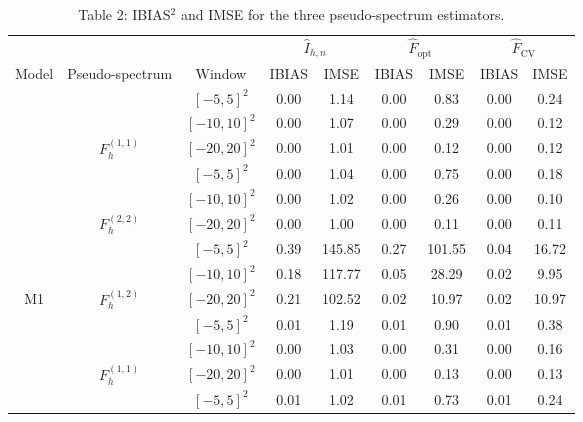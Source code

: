 \documentclass[12pt]{article}
\begin{document}
\begin{table}
	
	\caption*{Table 2: IBIAS$^2$ and IMSE for the three pseudo-spectrum estimators.}
	\centering
	\begin{tabular}[t]{ccccccccc}
		\toprule
		\multicolumn{3}{c}{ } & \multicolumn{2}{c}{$\hat{I}_{h,n}$} & \multicolumn{2}{c}{$\hat{F}_\text{opt}$} & \multicolumn{2}{c}{$\hat{F}_\text{CV}$} \\
		\cmidrule(l{3pt}r{3pt}){4-5} \cmidrule(l{3pt}r{3pt}){6-7} \cmidrule(l{3pt}r{3pt}){8-9}
		Model & Pseudo-spectrum & Window & IBIAS & IMSE & IBIAS & IMSE & IBIAS & IMSE\\
		\midrule
		&  & $[-5,5]^2$ & 0.00 & 1.14 & 0.00 & 0.83 & 0.00 & 0.24\\
		
		&  & $[-10,10]^2$ & 0.00 & 1.07 & 0.00 & 0.29 & 0.00 & 0.12\\
		
		& \multirow{-3}{*}{$F^{(1,1)}_h$} & $[-20,20]^2$ & 0.00 & 1.01 & 0.00 & 0.12 & 0.00 & 0.12\\
		\cmidrule{2-9}
		&  & $[-5,5]^2$ & 0.00 & 1.04 & 0.00 & 0.75 & 0.00 & 0.18\\
		
		&  & $[-10,10]^2$ & 0.00 & 1.02 & 0.00 & 0.26 & 0.00 & 0.10\\
		
		& \multirow{-3}{*}{$F^{(2,2)}_h$} & $[-20,20]^2$ & 0.00 & 1.00 & 0.00 & 0.11 & 0.00 & 0.11\\
		\cmidrule{2-9}
		&  & $[-5,5]^2$ & 0.39 & 145.85 & 0.27 & 101.55 & 0.04 & 16.72\\
		
		&  & $[-10,10]^2$ & 0.18 & 117.77 & 0.05 & 28.29 & 0.02 & 9.95\\
		
		\multirow{-9}{*}[1\dimexpr\aboverulesep+\belowrulesep+\cmidrulewidth]{M1} & \multirow{-3}{*}{$F^{(1,2)}_h$} & $[-20,20]^2$ & 0.21 & 102.52 & 0.02 & 10.97 & 0.02 & 10.97\\
		\cmidrule{1-9}
		&  & $[-5,5]^2$ & 0.01 & 1.19 & 0.01 & 0.90 & 0.01 & 0.38\\
		
		&  & $[-10,10]^2$ & 0.00 & 1.03 & 0.00 & 0.31 & 0.00 & 0.16\\
		
		& \multirow{-3}{*}{$F^{(1,1)}_h$} & $[-20,20]^2$ & 0.00 & 1.01 & 0.00 & 0.13 & 0.00 & 0.13\\
		\cmidrule{2-9}
		&  & $[-5,5]^2$ & 0.01 & 1.02 & 0.01 & 0.73 & 0.01 & 0.24\\
		

\end{tabular}
\end{table}
\end{document}
